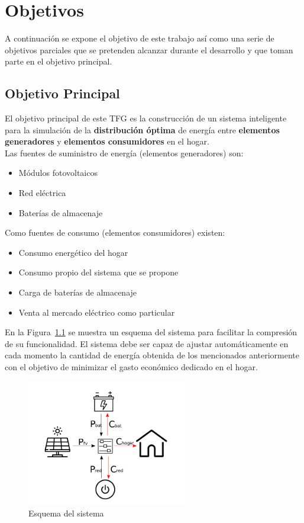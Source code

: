 \chapter{Objetivos}
\label{cap:Objetivo}
A continuación se expone el objetivo de este trabajo así como una serie de objetivos parciales que se pretenden alcanzar durante el desarrollo y que toman parte en el objetivo principal.
\section{Objetivo Principal}
El objetivo principal de este \gls{TFG} es la construcción de un sistema inteligente para la simulación de la \textbf{distribución óptima} de energía entre \textbf{elementos generadores} y \textbf{elementos consumidores} en el hogar.\\
Las fuentes de suministro de energía (elementos generadores) son:
\begin{itemize}
	\item Módulos fotovoltaicos
	\item Red eléctrica
	\item Baterías de almacenaje
\end{itemize}
Como fuentes de consumo (elementos consumidores) existen:
\begin{itemize}
	\item Consumo energético del hogar
	\item Consumo propio del sistema que se propone
	\item Carga de baterías de almacenaje
	\item Venta al mercado eléctrico como particular
\end{itemize}
En la Figura~\ref{fig:schema} se muestra un esquema del sistema para facilitar la compresión de su funcionalidad. El sistema debe ser capaz de ajustar automáticamente en cada momento la cantidad de energía obtenida de los mencionados anteriormente con el objetivo de minimizar el gasto económico dedicado en el hogar.

\begin{figure}[!h]
	\centering
	\includegraphics[width=7cm]{figs/Esquema.png}
	\caption{Esquema del sistema}
        \label{fig:schema}
\end{figure}

